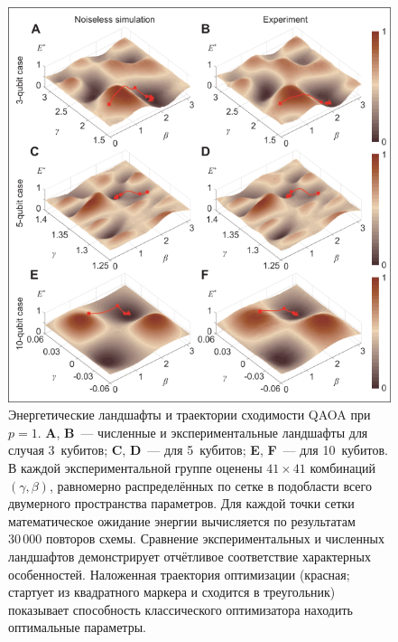 \begin{figure}
    \centering
    \includegraphics[scale=0.4]{inc/fig_03.png}
    \caption{
        Энергетические ландшафты и траектории сходимости QAOA при $p = 1$.
        \textbf{A}, \textbf{B} — численные и экспериментальные ландшафты для
        случая 3 кубитов; \textbf{C}, \textbf{D} — для 5 кубитов; \textbf{E},
        \textbf{F} — для 10 кубитов. В каждой экспериментальной группе оценены
        $41\times 41$ комбинаций $(\gamma,\beta)$, равномерно распределённых по
        сетке в подобласти всего двумерного пространства параметров. Для каждой
        точки сетки математическое ожидание энергии вычисляется по результатам
        $30\,000$ повторов схемы. Сравнение экспериментальных и численных
        ландшафтов демонстрирует отчётливое соответствие характерных
        особенностей. Наложенная траектория оптимизации (красная; стартует из
        квадратного маркера и сходится в треугольник) показывает способность
        классического оптимизатора находить оптимальные параметры.
    }
    \label{fig:fig03}
\end{figure}

